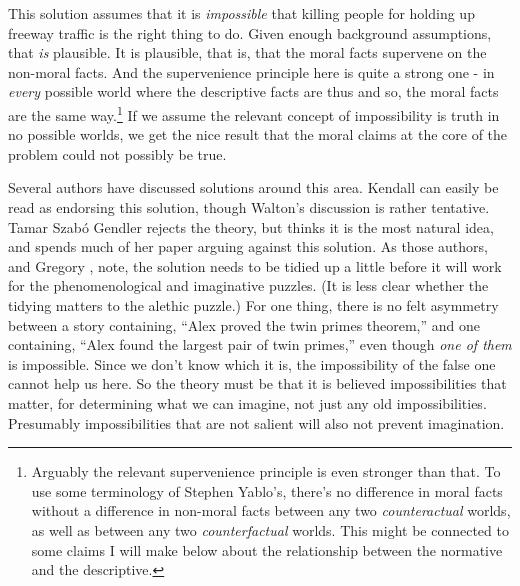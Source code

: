 This solution assumes that it is \textit{impossible} that killing people for holding up freeway traffic is the right thing to do. Given enough background assumptions, that \textit{is }plausible. It is plausible, that is, that the moral facts supervene on the non-moral facts. And the supervenience principle here is quite a strong one - in \textit{every} possible world where the descriptive facts are thus and so, the moral facts are the same way.\footnote{Arguably the relevant supervenience principle is even stronger than that. To use some terminology of Stephen Yablo's, there's no difference in moral facts without a difference in non-moral facts between any two \textit{counteractual} worlds, as well as between any two \textit{counterfactual }worlds. This might be connected to some claims I will make below about the relationship between the normative and the descriptive.} If we assume the relevant concept of impossibility is truth in no possible worlds, we get the nice result that the moral claims at the core of the problem could not possibly be true.

Several authors have discussed solutions around this area. Kendall \citet{Walton1994} can easily be read as endorsing this solution, though Walton's discussion is rather tentative. Tamar Szab\'{o} Gendler rejects the theory, but thinks it is the most natural idea, and spends much of her paper arguing against this solution. As those authors, and Gregory \citet{Currie2002}, note, the solution needs to be tidied up a little before it will work for the phenomenological and imaginative puzzles. (It is less clear whether the tidying matters to the alethic puzzle.) For one thing, there is no felt asymmetry between a story containing, ``Alex proved the twin primes theorem,'' and one containing, ``Alex found the largest pair of twin primes,'' even though \textit{one of them} is impossible. Since we don't know which it is, the impossibility of the false one cannot help us here. So the theory must be that it is believed impossibilities that matter, for determining what we can imagine, not just any old impossibilities. Presumably impossibilities that are not salient will also not prevent imagination.

